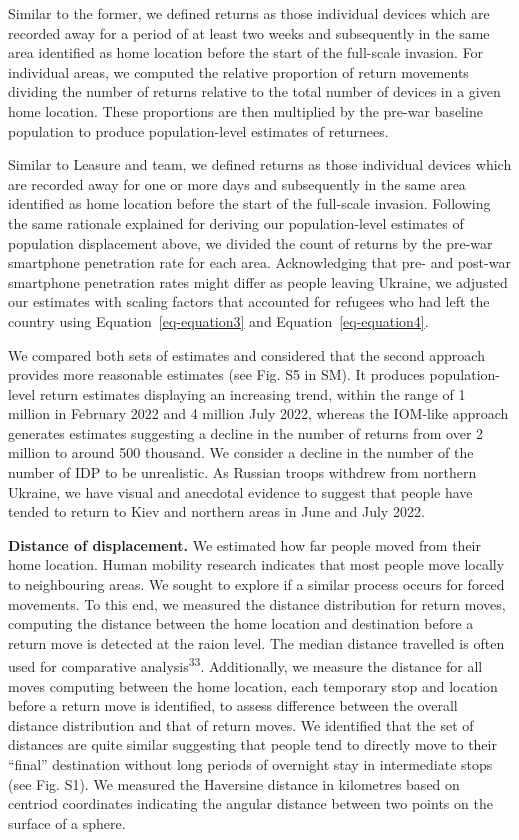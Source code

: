 \documentclass[
  11pt,
]{article}
\begin{document}
Similar to the former, we defined returns as those individual devices
which are recorded away for a period of at least two weeks and
subsequently in the same area identified as home location before the
start of the full-scale invasion. For individual areas, we computed the
relative proportion of return movements dividing the number of returns
relative to the total number of devices in a given home location. These
proportions are then multiplied by the pre-war baseline population to
produce population-level estimates of returnees.

Similar to Leasure and team, we defined returns as those individual
devices which are recorded away for one or more days and subsequently in
the same area identified as home location before the start of the
full-scale invasion. Following the same rationale explained for deriving
our population-level estimates of population displacement above, we
divided the count of returns by the pre-war smartphone penetration rate
for each area. Acknowledging that pre- and post-war smartphone
penetration rates might differ as people leaving Ukraine, we adjusted
our estimates with scaling factors that accounted for refugees who had
left the country using Equation~\ref{eq-equation3} and
Equation~\ref{eq-equation4}.

We compared both sets of estimates and considered that the second
approach provides more reasonable estimates (see Fig. S5 in SM). It
produces population-level return estimates displaying an increasing
trend, within the range of 1 million in February 2022 and 4 million July
2022, whereas the IOM-like approach generates estimates suggesting a
decline in the number of returns from over 2 million to around 500
thousand. We consider a decline in the number of the number of IDP to be
unrealistic. As Russian troops withdrew from northern Ukraine, we have
visual and anecdotal evidence to suggest that people have tended to
return to Kiev and northern areas in June and July 2022.

\textbf{Distance of displacement.} We estimated how far people moved
from their home location. Human mobility research indicates that most
people move locally to neighbouring areas. We sought to explore if a
similar process occurs for forced movements. To this end, we measured
the distance distribution for return moves, computing the distance
between the home location and destination before a return move is
detected at the raion level. The median distance travelled is often used
for comparative analysis\textsuperscript{33}. Additionally, we measure
the distance for all moves computing between the home location, each
temporary stop and location before a return move is identified, to
assess difference between the overall distance distribution and that of
return moves. We identified that the set of distances are quite similar
suggesting that people tend to directly move to their ``final''
destination without long periods of overnight stay in intermediate stops
(see Fig. S1). We measured the Haversine distance in kilometres based on
centriod coordinates indicating the angular distance between two points
on the surface of a sphere.
\end{document}
